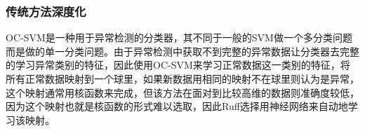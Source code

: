 





\subsubsection{传统方法深度化}

OC-SVM\cite{DBLP:journals/tdsc/WatsonSMMH16}是一种用于异常检测的分类器，其不同于一般的SVM做一个多分类问题而是做的单一分类问题。由于异常检测中获取不到完整的异常数据让分类器去完整的学习异常类别的特征，因此使用OC-SVM来学习正常数据这一类别的特征，将所有正常数据映射到一个球里，如果新数据用相同的映射不在球里则认为是异常，这个映射通常用核函数来完成，但该方法在面对到比较高维的数据则准确度较低，因为这个映射也就是核函数的形式难以选取，因此Ruff\cite{ruff2018deep}选择用神经网络来自动地学习该映射。

